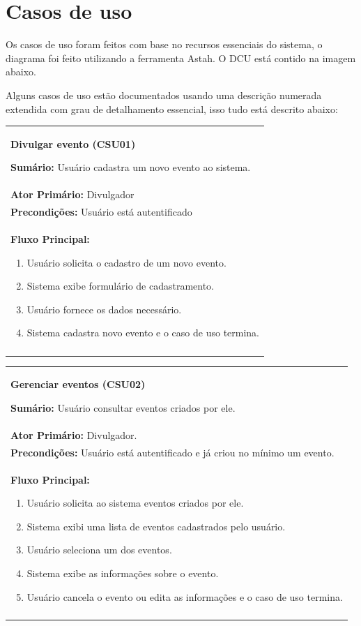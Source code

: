 \documentclass{article}
\newcommand{\sumario}[1] {\textbf{Sumário:} #1\\ \medskip}
\newcommand{\ator}[1] {\textbf{Ator Primário:} #1\\ \medskip}
\newcommand{\precond}[1] {\textbf{Precondições:} #1\\ \medskip}
\newcommand{\fluxo}{\textbf{Fluxo Principal:} \medskip}
\newenvironment{boxed}[1]
    {
\begin{center}
    \begin{tabular}{|p{\textwidth}|}
    \hline
\begin{center}
	{\large \textbf{#1}}
\end{center}
    }
    { 
    \\\\\hline
    \end{tabular} 
    \end{center}
    }
\begin{document}
	\section{Casos de uso} \bigskip

	Os casos de uso foram feitos com base no recursos essenciais do sistema, o diagrama foi feito utilizando a ferramenta Astah. O DCU está contido na imagem abaixo.


	Alguns casos de uso estão documentados usando uma descrição numerada extendida com grau de detalhamento essencial, isso tudo está descrito abaixo: 

	\begin{boxed}{Divulgar evento (CSU01)}
	\sumario{Usuário cadastra um novo evento ao sistema.}
	\ator{Divulgador}
	\precond{Usuário está autentificado}
	\fluxo
	\begin{enumerate}[itemsep=0mm]
	\item Usuário solicita o cadastro de um novo evento.
	 \item Sistema exibe formulário de cadastramento.
	\item Usuário fornece os dados necessário.
	 \item Sistema cadastra novo evento e o caso de uso termina.
	\end{enumerate}
	\end{boxed}


	\begin{boxed}{Gerenciar eventos (CSU02)}
	\sumario{Usuário consultar eventos criados por ele.}
	\ator{Divulgador.}
	\precond{Usuário está autentificado e já criou no mínimo um evento.}
	\fluxo
	\begin{enumerate}[itemsep=0mm]
	 \item Usuário solicita ao sistema eventos criados por ele.
	 \item Sistema exibi uma lista de eventos cadastrados pelo usuário.
	 \item Usuário seleciona um dos eventos.
	 \item Sistema exibe as informações sobre o evento.
	 \item Usuário cancela o evento ou edita as informações e o caso de uso termina.\bigskip
	\end{enumerate}
	\end{boxed}
\end{document}
